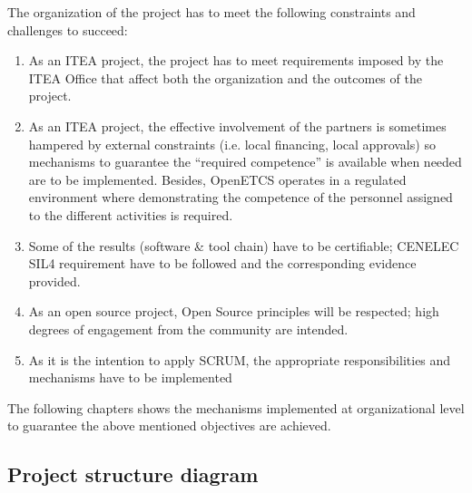 \documentclass{template/openetcs_article}
\begin{document}
The organization of the project has to meet the following constraints and challenges to succeed:

\begin{enumerate}
\item As an ITEA project, the project has to meet requirements imposed by the ITEA Office that affect both the organization and the outcomes of the project.
\item As an ITEA project, the effective involvement of the partners is sometimes hampered by external constraints (i.e. local financing, local approvals) so mechanisms to guarantee the “required competence” is available when needed are to be implemented. Besides, OpenETCS operates in a regulated environment where demonstrating the competence of the personnel assigned to the different activities is required. 
\item Some of the results (software \& tool chain) have to be certifiable; CENELEC SIL4 requirement \citep{subset026} have to be followed and the corresponding evidence provided. 
\item As an open source project, Open Source principles will be respected; high degrees of engagement from the community are intended.
\item As it is the intention to apply SCRUM, the appropriate responsibilities and mechanisms have to be implemented
\end{enumerate}

The following chapters shows the mechanisms implemented at organizational level to guarantee the above mentioned objectives are achieved.


\subsection{Project structure diagram}





\end{document}
